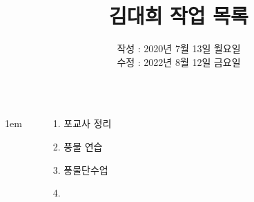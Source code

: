 \documentclass[25pt, a1paper ]{tikzposter}
\title{김대희 작업 목록 }
\author{ 	작성 : 2020년 7월 13일 월요일 \\
			수정 : 2022년 8월 12일 금요일 }
\begin{document}
	\maketitle

	\begin{columns}
			{
					\setlength{\leftmargini}{7em}
					\setlength{\labelsep} {1em}
				\begin{LARGE}
					\begin{itemize}
					\item [1.] 포교사 정리
					\item [2.] 풍물 연습
					\item [3.] 풍물단수업
					\item [4.] 
					\end{itemize}
				\end{LARGE}
			}







%





\end{columns}
\end{document}
